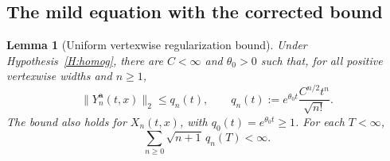\documentclass[12pt]{article}
\numberwithin{equation}{section}
\newtheorem{lemma}[theorem]{Lemma}
\theoremstyle{definition}
\begin{document}
\subsection{The mild equation with the corrected bound}

\begin{lemma}[Uniform vertexwise regularization bound]\label{L:vertex-crude}
  Under Hypothesis~\ref{H:homog}, there are $C<\infty$ and $\theta_0>0$
  such that, for all positive vertexwise widths and $n\ge1$,
  \begin{equation}\label{E:vertex-crude}
    \|Y_n^{\boldsymbol a}(t,x)\|_2\le q_n(t),\qquad
    q_n(t):=e^{\theta_0t}\frac{C^{n/2}t^n}{\sqrt{n!}}.
  \end{equation}
  The bound also holds for $X_n(t,x)$, with $q_0(t)=e^{\theta_0t}\ge1$.
  For each $T<\infty$,
  \begin{equation}\label{E:vertex-summability}
    \sum_{n\ge0}\sqrt{n+1}\,q_n(T)<\infty.
  \end{equation}
\end{lemma}
\end{document}
